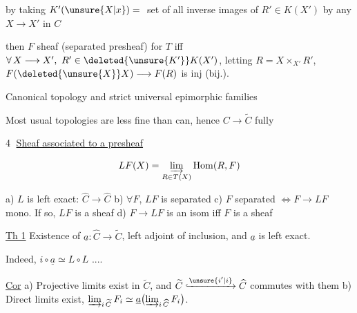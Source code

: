 by taking  $K'(\unsure{X|x})={}$ set of all inverse images of $R'\in K(X')$ by any $X\longrightarrow X'$ in $C$

then $F$  sheaf (separated presheaf) for $T$ iff  $\forall\,X\longrightarrow X',\ R'\in \deleted{\unsure{K'}}K(X')$, letting $R=X\times_{X'}R'$, $F(\deleted{\unsure{X}}X)\longrightarrow F(R)$ is inj (bij.).

Canonical topology and strict universal epimorphic families

 Most usual topologies are less fine than can, hence $C\longrightarrow\widetilde C$ fully 


\textcircled{4} \uline{Sheaf associated to a presheaf}

\[ LF(X)=\varinjlim_{R\in T(X)}\operatorname{Hom}(R,F) \]



a) $L$ is left exact: $\widehat C\longrightarrow\widehat C$ 
b) $\forall F$, $LF$ is separated
c) $F$ separated $\Longleftrightarrow F\longrightarrow LF$ mono. If so, $LF$ is a sheaf
d) $F\longrightarrow LF$ is an isom iff $F$ is a sheaf

\uline{Th 1} Existence of $\underline a\colon\widehat C\longrightarrow\widetilde C$, left adjoint of inclusion, and  $\underline a$ is left exact.

Indeed, $i\circ\underline a\simeq L\circ L$ ....

\uline{Cor} a) Projective limits exist in $\widetilde C$, and $\widetilde C\lhook\joinrel\xrightarrow{\unsure{i'|i}}\widehat C$ commutes with them
b) Direct limits exist, $\varinjlim_{i\,\widetilde C} F_i\simeq\underline a\bigl(\varinjlim_{i\,\widehat C} F_i\bigr)$.

